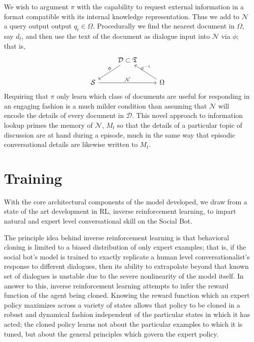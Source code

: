 \documentclass{article} %
\theoremstyle{named}
\def\scriptd{{\mathcal D}}
\def\scriptn{{\mathcal N}}
\def\scripts{{\mathcal S}}
\begin{document}
\begin{enumerate}
We wish to argument $\pi$ with the capability to request external information in a format compatible with its internal knowledge representation. Thus we add to $\scriptn$ a query output output $q_t \in \Omega.$ Procedurally we find the nearest document in $\Omega$, say $d_t$, and then use the text of the document as dialogue input into $\scriptn$ via $\phi$; that is,
\begin{equation*}
  \begin{tikzcd}
    & \scriptd \subset \mathfrak{T} \arrow{ld}[above]{\phi} & \\
    \scripts \arrow{rr}{\scriptn} & & \Omega \arrow{lu}[above]{\psi^{-1}}
  \end{tikzcd}
\end{equation*}
Requiring that $\pi$ only learn which class of documents are useful for responding in an engaging fashion is a much milder condition than assuming that $\scriptn$ will encode the details of every document in $\scriptd$. This novel approach to information lookup primes the memory of $\scriptn$, $M_t$ so that the details of a particular topic of discussion are at hand during a  episode, much in the same way that episodic conversational details are likewise written to $M_t$.
\end{enumerate}


\section{Training}
With the core architectural components of the model developed, we draw from a state of the art development in RL, inverse reinforcement learning\cite{ng2000algorithms}, to impart natural and expert level conversational skill on the Social Bot.

The principle idea behind inverse reinforcement learning is that behavioral cloning is limited to a biased distribution of only expert examples; that is, if the social bot’s model is trained to exactly replicate a human level conversationalist's response to different dialogues, then its ability to extrapolate beyond that known set of dialogues is unstable due to the severe nonlinearity of the model itself. In answer to this, inverse reinforcement learning attempts to infer the reward function of the agent being cloned. Knowing the reward function which an expert policy maximizes across a variety of states allows that policy to be cloned in a robust and dynamical fashion independent of the particular states in which it has acted; the cloned policy learns not about the particular examples to which it is tuned, but about the general principles which govern the expert policy.
\end{document}

